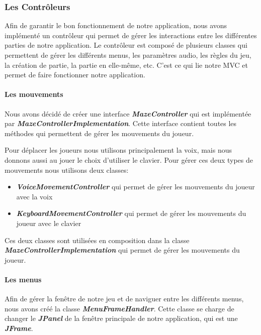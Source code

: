 \subsubsection{Les Contrôleurs}
\label{subsubsec:controleur}

Afin de garantir le bon fonctionnement de notre application, nous avons implémenté un contrôleur qui permet de gérer les interactions entre les différentes parties de notre application. Le contrôleur est composé de plusieurs classes qui permettent de gérer les différents menus, les paramètres audio, les règles du jeu, la création de partie, la partie en elle-même, etc. C'est ce qui lie notre MVC et permet de faire fonctionner notre application.

\paragraph{Les mouvements}

Nous avons décidé de créer une interface \textbf{\textit{MazeController}} qui est implémentée par \textbf{\textit{MazeControllerImplementation}}. Cette interface
contient toutes les méthodes qui permettent de gérer les mouvements du joueur.


Pour déplacer les joueurs nous utilisons principalement la voix, mais nous donnons aussi au jouer le choix d'utiliser le clavier. Pour gérer ces deux types de mouvements
nous utilisons deux classes:
\begin{itemize}
    \item \textbf{\textit{VoiceMovementController}} qui permet de gérer les mouvements du joueur avec la voix
    \item \textbf{\textit{KeyboardMovementController}} qui permet de gérer les mouvements du joueur avec le clavier
\end{itemize}
Ces deux classes sont utilisées en composition dans la classe \textbf{\textit{MazeControllerImplementation}} qui permet de gérer les mouvements du joueur.


\paragraph{Les menus}

Afin de gérer la fenêtre de notre jeu et de naviguer entre les différents menus, nous avons créé la classe \textbf{\textit{MenuFrameHandler}}. Cette classe se charge de changer le \textbf{\textit{JPanel}} de la fenêtre principale de notre application, qui est une \textbf{\textit{JFrame}}.



